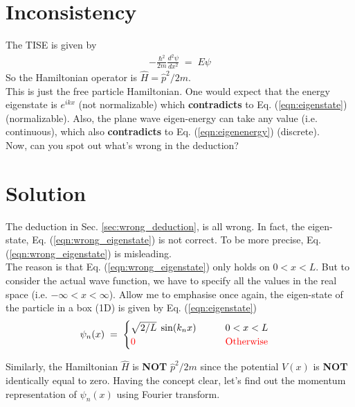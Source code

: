 \documentclass[12pt,a4paper]{article}
\begin{document}
\section{Inconsistency}
The TISE is given by
\begin{align}
	-\frac{\hbar^{2}}{2m} \frac{d^{2} \psi}{dx^{2}} \; = \; E \psi
\end{align}
So the Hamiltonian operator is $\hat{H} = \hat{p}^{2}/2m$.\\

This is just the free particle Hamiltonian. One would expect that the energy eigenstate is $e^{ikx}$ (not normalizable) which \textbf{contradicts} to Eq. (\ref{eqn:eigenstate}) (normalizable). Also, the plane wave eigen-energy can take any value (i.e. continuous), which also \textbf{contradicts} to Eq. (\ref{eqn:eigenenergy}) (discrete).\\

\color{red} Now, can you spot out what's wrong in the deduction? \color{black}



\section{Solution}
The deduction in Sec. \ref{sec:wrong_deduction}, is all wrong. In fact, the eigen-state, Eq. (\ref{eqn:wrong_eigenstate}) is not correct. To be more precise, Eq. (\ref{eqn:wrong_eigenstate}) is misleading.\\

The reason is that Eq. (\ref{eqn:wrong_eigenstate}) only holds on $0 < x < L$. But to consider the actual wave function, we have to specify all the values in the real space (i.e. $-\infty < x < \infty$). Allow me to emphasise once again, the eigen-state of the particle in a box (1D) is given by Eq. (\ref{eqn:eigenstate})
\begin{align}
	\psi_{n}(x) \; &= \; 
	\begin{cases}
		\sqrt{2/L} \; \sin (k_{n} x) \qquad & 0 < x < L \\
		\color{red} 0 \qquad & \color{red} \mathrm{Otherwise}
	\end{cases}
\end{align}

Similarly, the Hamiltonian $\hat{H}$ is \textbf{NOT} $\hat{p}^{2}/2m$ since the potential $V(x)$ is \textbf{NOT} identically equal to zero. Having the concept clear, let's find out the momentum representation of $\psi_{n}(x)$ using Fourier transform.
\end{document}
